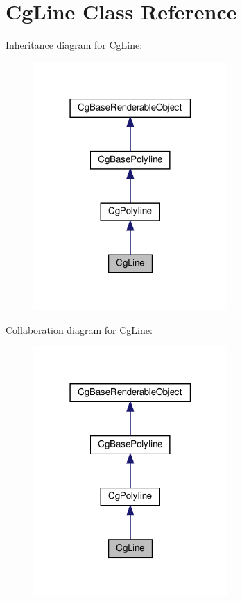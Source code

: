 \hypertarget{class_cg_line}{}\section{Cg\+Line Class Reference}
\label{class_cg_line}


Inheritance diagram for Cg\+Line\+:
\nopagebreak
\begin{figure}[H]
\begin{center}
\leavevmode
\includegraphics[width=210pt]{class_cg_line__inherit__graph}
\end{center}
\end{figure}


Collaboration diagram for Cg\+Line\+:
\nopagebreak
\begin{figure}[H]
\begin{center}
\leavevmode
\includegraphics[width=210pt]{class_cg_line__coll__graph}
\end{center}
\end{figure}
